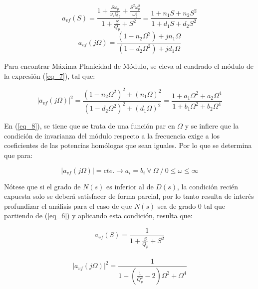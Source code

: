 \documentclass[12pt,a4paper]{article}
\begin{document}
\begin{equation}
    \label{eq_6}
    a_{vf}(S) = \frac{1 + \frac{S \omega_p }{\omega_z Q_z} + \frac{S^2 \omega_p^2}{\omega_z^2}}{1 + \frac{S}{Q_p} + S^2} = \frac{1 + n_1 S + n_2 S^2}{1 + d_1 S + d_2 S^2}
\end{equation}
\begin{equation}
    \label{eq_7}
    a_{vf}(j\Omega) = \frac{(1 - n_2 \Omega^2) + jn_1 \Omega}{(1 - d_2 \Omega^2) + jd_1 \Omega}
\end{equation}
\hspace{0.5 cm}

Para encontrar Máxima Planicidad de Módulo, se eleva al cuadrado el módulo de la expresión (\ref{eq_7}), tal que:

    \begin{equation}
        \label{eq_8}
        |a_{vf}(j\Omega)|^2 = \frac{(1 - n_2 \Omega^2)^2 + (n_1 \Omega)^2}{(1 - d_2 \Omega^2)^2 + (d_1 \Omega)^2} = \frac{1 + a_1\Omega^2 + a_2\Omega^4}{1 + b_1\Omega^2 + b_2\Omega^4}
    \end{equation}
    \hspace{0.5 cm}


En (\ref{eq_8}), se tiene que se trata de una función par en $\Omega$ y se infiere que la condición de invarianza del módulo respecto a la frecuencia exige a los coeficientes de las potencias homólogas que sean iguales. Por lo que se determina que para:

\[
|a_{vf}(j\Omega)|=cte. \xrightarrow{} a_i = b_i \ \forall \ \Omega \ / \ 0 \leqslant \omega \leqslant \infty
\]
    \hspace{0.5 cm}

    
Nótese que si el grado de $N(s)$ es inferior al de $D(s)$, la condición recién expuesta solo se deberá satisfacer de forma parcial, por lo tanto resulta de interés profundizar el análisis para el caso de que $N(s)$ sea de grado 0 tal que partiendo de (\ref{eq_6}) y aplicando esta condición, resulta que:

    \begin{equation}
        \label{eq_9}
        a_{vf}(S) = \frac{1}{1 + \frac{S}{Q_p} + S^2}
    \end{equation}
    \\
    \begin{equation}
        \label{eq_10}
        |a_{vf}(j\Omega)|^2 = \frac{1}{1 + (\frac{1}{Q_p^2} - 2)\Omega^2 + \Omega^4}
    \end{equation}
\hspace{0.5 cm}
\end{document}
